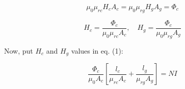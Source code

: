 \documentclass{article}
\begin{document}
\begin{equation}
    \mu_0 \mu_{rc} H_c A_c = \mu_0 \mu_{rg} H_g A_g = \Phi_c \tag{3}
\end{equation}

\begin{equation*}
    H_c = \frac{\Phi_c}{\mu_0\mu_{rc} A_c}, \quad H_g = \frac{\Phi_c}{\mu_0\mu_{rg} A_g}
\end{equation*}

Now, put \( H_c \) and \( H_g \) values in eq. (1):

\begin{equation}
    \frac{\Phi_c}{\mu_0 A_c} \left[ \frac{l_c}{\mu_{rc} A_c} + \frac{l_g}{\mu_{rg} A_g} \right] = NI
\end{equation}
\end{document}
